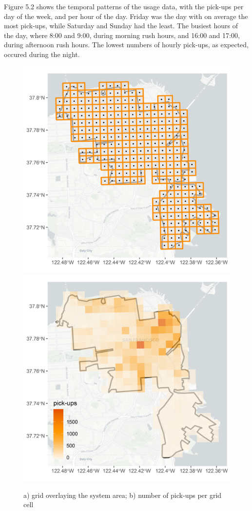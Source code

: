 \documentclass[12pt,oneside]{reedthesis}
\begin{document}
Figure 5.2 shows the temporal patterns of the usage data, with the
pick-ups per day of the week, and per hour of the day. Friday was the
day with on average the most pick-ups, while Saturday and Sunday had the
least. The busiest hours of the day, where 8:00 and 9:00, during morning
rush hours, and 16:00 and 17:00, during afternoon rush hours. The lowest
numbers of hourly pick-ups, as expected, occured during the night.
\begin{figure}[H]
\includegraphics[width=0.5\linewidth]{Figures/grid} \includegraphics[width=0.5\linewidth]{Figures/pickups} \caption{a) grid overlaying the system area; b) number of pick-ups per grid cell}\label{fig:mapandgrid}
\end{figure}\begin{figure}[H]

\end{figure}
\end{document}

